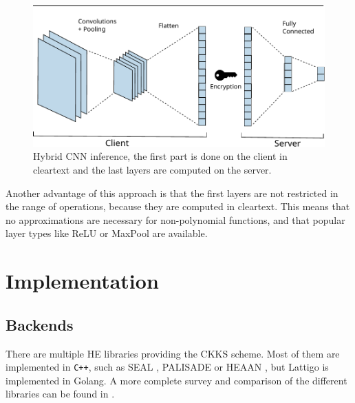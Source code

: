 \documentclass[a4paper,11pt,oneside]{report}
\begin{document}
\begin{figure}[h]
  \centering
  \includegraphics[width=\textwidth]{figures/layers.pdf}
  \caption{Hybrid CNN inference, the first part is done on the client in cleartext and the last layers are computed on the server.}
  \label{fig:hybrid_cnn}
\end{figure}

Another advantage of this approach is that the first layers are not restricted in the range of operations, because they are computed in cleartext. 
This means that no approximations are necessary for non-polynomial functions, and that popular layer types like ReLU or MaxPool are available.


\chapter{Implementation}



\section{Backends}

There are multiple HE libraries providing the CKKS scheme. Most of them are implemented in \texttt{C++}, such as SEAL \cite{microsoft_corporation_microsoft_2022}, PALISADE \cite{palisade_palisade_2022} or HEAAN \cite{cryptolab_inc_heaan_2022}, but Lattigo \cite{tune_insight_sa_lattigo_2022} is implemented in Golang. 
A more complete survey and comparison of the different libraries can be found in \cite{viand_sok_2021}.
\end{document}
